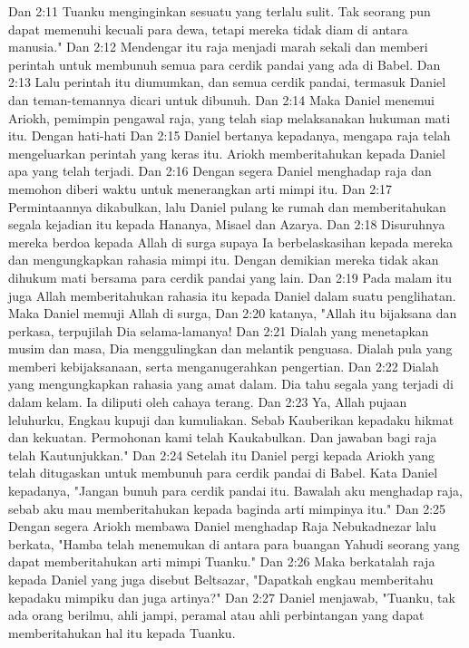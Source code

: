 Dan 2:11  Tuanku menginginkan sesuatu yang terlalu sulit. Tak seorang pun dapat memenuhi kecuali para dewa, tetapi mereka tidak diam di antara manusia."
Dan 2:12  Mendengar itu raja menjadi marah sekali dan memberi perintah untuk membunuh semua para cerdik pandai yang ada di Babel.
Dan 2:13  Lalu perintah itu diumumkan, dan semua cerdik pandai, termasuk Daniel dan teman-temannya dicari untuk dibunuh.
Dan 2:14  Maka Daniel menemui Ariokh, pemimpin pengawal raja, yang telah siap melaksanakan hukuman mati itu. Dengan hati-hati
Dan 2:15  Daniel bertanya kepadanya, mengapa raja telah mengeluarkan perintah yang keras itu. Ariokh memberitahukan kepada Daniel apa yang telah terjadi.
Dan 2:16  Dengan segera Daniel menghadap raja dan memohon diberi waktu untuk menerangkan arti mimpi itu.
Dan 2:17  Permintaannya dikabulkan, lalu Daniel pulang ke rumah dan memberitahukan segala kejadian itu kepada Hananya, Misael dan Azarya.
Dan 2:18  Disuruhnya mereka berdoa kepada Allah di surga supaya Ia berbelaskasihan kepada mereka dan mengungkapkan rahasia mimpi itu. Dengan demikian mereka tidak akan dihukum mati bersama para cerdik pandai yang lain.
Dan 2:19  Pada malam itu juga Allah memberitahukan rahasia itu kepada Daniel dalam suatu penglihatan. Maka Daniel memuji Allah di surga,
Dan 2:20  katanya, "Allah itu bijaksana dan perkasa, terpujilah Dia selama-lamanya!
Dan 2:21  Dialah yang menetapkan musim dan masa, Dia menggulingkan dan melantik penguasa. Dialah pula yang memberi kebijaksanaan, serta menganugerahkan pengertian.
Dan 2:22  Dialah yang mengungkapkan rahasia yang amat dalam. Dia tahu segala yang terjadi di dalam kelam. Ia diliputi oleh cahaya terang.
Dan 2:23  Ya, Allah pujaan leluhurku, Engkau kupuji dan kumuliakan. Sebab Kauberikan kepadaku hikmat dan kekuatan. Permohonan kami telah Kaukabulkan. Dan jawaban bagi raja telah Kautunjukkan."
Dan 2:24  Setelah itu Daniel pergi kepada Ariokh yang telah ditugaskan untuk membunuh para cerdik pandai di Babel. Kata Daniel kepadanya, "Jangan bunuh para cerdik pandai itu. Bawalah aku menghadap raja, sebab aku mau memberitahukan kepada baginda arti mimpinya itu."
Dan 2:25  Dengan segera Ariokh membawa Daniel menghadap Raja Nebukadnezar lalu berkata, "Hamba telah menemukan di antara para buangan Yahudi seorang yang dapat memberitahukan arti mimpi Tuanku."
Dan 2:26  Maka berkatalah raja kepada Daniel yang juga disebut Beltsazar, "Dapatkah engkau memberitahu kepadaku mimpiku dan juga artinya?"
Dan 2:27  Daniel menjawab, "Tuanku, tak ada orang berilmu, ahli jampi, peramal atau ahli perbintangan yang dapat memberitahukan hal itu kepada Tuanku.
